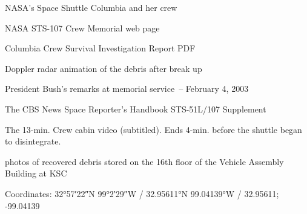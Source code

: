 NASA's Space Shuttle Columbia and her crew

NASA STS-107 Crew Memorial web page

Columbia Crew Survival Investigation Report PDF

Doppler radar animation of the debris after break up

President Bush's remarks at memorial service~-- February 4, 2003

The CBS News Space Reporter's Handbook STS-51L/107 Supplement

The 13-min. Crew cabin video (subtitled). Ends 4-min. before the shuttle
began to disintegrate.

photos of recovered debris stored on the 16th floor of the Vehicle
Assembly Building at KSC

Coordinates: 32°57′22″N 99°2′29″W﻿ / ﻿32.95611°N 99.04139°W﻿ / 32.95611;
-99.04139
